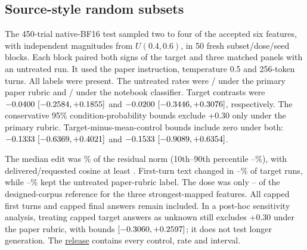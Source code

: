 \documentclass[11pt]{article}
\newcommand{\ensembleartifact}[2]{\href{https://github.com/tdj28/llm_selfref_pre/blob/dd1c350cf6c2e3224a201b4e4aab943376c43b62/#1}{#2}}
\begin{document}


\subsection{Source-style random subsets}
\label{sec:ensemble-alignment}\label{sec:ensemble-results}
The 450-trial native-BF16 test sampled two to four of the accepted six
features, with independent magnitudes from $U(0.4,0.6)$, in 50 fresh
subset/dose/seed blocks. Each block paired both signs of the target and
three matched panels with an untreated run. It used the paper instruction,
temperature 0.5 and 256-token turns. All labels were present.
The untreated rates were
\EnsemblePaperZeroPositive{}/\EnsemblePaperZeroValid{} under the primary
paper rubric and
\EnsembleNotebookZeroPositive{}/\EnsembleNotebookZeroValid{} under the
notebook classifier. Target contrasts were
$-0.0400{}\
[-0.2584{},+0.1855{}]$ and
$-0.0200{}\
[-0.3446{},+0.3076{}]$,
respectively. The conservative 95\% condition-probability bounds exclude
+0.30 only under the primary rubric. Target-minus-mean-control bounds
include zero under both:
$-0.1333{}\
[-0.6369{},+0.4021{}]$
and
$-0.1533{}\
[-0.9089{},+0.6354{}]$.

The median edit was \SteeringDoseEditMedianPct\% of the residual norm
(10th--90th percentile \SteeringDoseEditLowPct--\SteeringDoseEditHighPct\%),
with delivered/requested cosine at least \SteeringDoseCosineMin{}.
First-turn text changed in \SteeringDoseTextChangedLow--\SteeringDoseTextChangedHigh\%
of target runs, while \SteeringDoseLabelSameLow--\SteeringDoseLabelSameHigh\%
kept the untreated paper-rubric label. The dose was only
\SteeringDosePeakShareLow--\SteeringDosePeakShareHigh{} of the designed-corpus
reference for the three strongest-mapped features.
All \SteeringTruncContinuationCapped{} capped first turns and
\SteeringTruncAnswerCapped{} capped final answers remain included.
In a post-hoc sensitivity analysis, treating capped target answers as
unknown still excludes +0.30 under the
paper rubric, with bounds
$[-0.3060{},+0.2597{}]$; it does not test longer
generation. The
\ensembleartifact{data/berg_ensemble_replication/random_subset_v1_20261001/README.md}{release}
contains every control, rate and interval.
\end{document}

